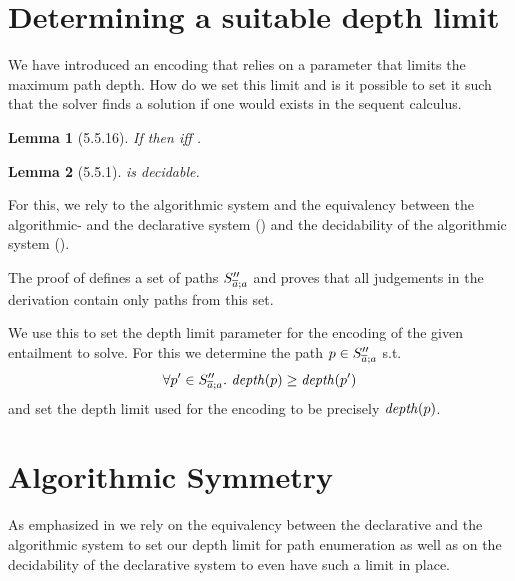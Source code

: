 \documentclass[a4paper]{article}
\newtheorem{lemma}{Lemma}
\begin{document}
\newpage
%
\section{Determining a suitable depth limit}
\label{sec:determine-depth-limit}
We have introduced an encoding that relies on a parameter
that limits the maximum path depth.
How do we set this limit and is it possible to set it such
that the solver finds a solution if one would exists in the sequent calculus.

\begin{lemma}[5.5.16]
  \label{lem:constraint-system-equiv}
  If  then  iff .
\end{lemma}

\begin{lemma}[5.5.1]
  \label{lem:algorithmic-system-decidable}
   is decidable.
\end{lemma}

For this, we rely to the algorithmic system and the equivalency
between the algorithmic- and the declarative system ()
and the decidability of the algorithmic system ().

The proof of 
defines a set of paths $S''_{\overline{a};a}$ and proves that
all judgements in the derivation contain only paths from this set.

We use this to set the depth limit parameter for the encoding
of the given entailment to solve.
For this we determine the path $p \in S''_{\overline{a};a}$ s.t.
\[ \forall p' \in S''_{\overline{a};a}.~\mathit{depth}(p) \geq \mathit{depth}(p') \]
and set the depth limit used for the encoding to be precisely $\mathit{depth}(p)$.

\section{Algorithmic Symmetry}
\label{sec:algo-symmetry}
As emphasized in 
we rely on the equivalency between the declarative and the algorithmic system
to set our depth limit for path enumeration
as well as on the decidability of the declarative system to even have such a limit in place.
\end{document}
